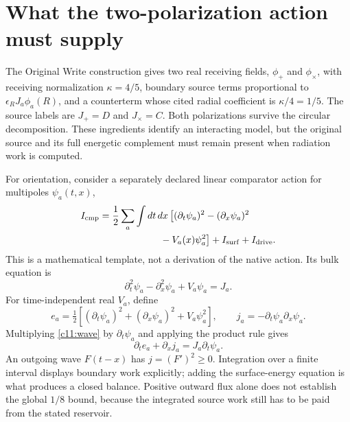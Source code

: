 \section{What the two-polarization action must supply}
The Original Write construction gives two real receiving fields, $\phi_+$ and $\phi_\times$, with receiving normalization $\kappa=4/5$, boundary source terms proportional to $\epsilon_R J_a\phi_a(R)$, and a counterterm whose cited radial coefficient is $\kappa/4=1/5$. The source labels are $J_+=D$ and $J_\times=C$. Both polarizations survive the circular decomposition. These ingredients identify an interacting model, but the original source and its full energetic complement must remain present when radiation work is computed.

For orientation, consider a separately declared linear comparator action for multipoles $\psi_a(t,x)$,
\begin{equation}
 \begin{aligned}
 I_{\rm cmp}={}&\frac12\sum_a\int dt\,dx\,
 \bigl[(\partial_t\psi_a)^2-(\partial_x\psi_a)^2\\
 &\hspace{5em}-V_a(x)\psi_a^2\bigr]
 +I_{\rm surf}+I_{\rm drive}.
 \end{aligned}
 \label{c11:comparatoraction}
\end{equation}
This is a mathematical template, not a derivation of the native action. Its bulk equation is
\begin{equation}
 \partial_t^2\psi_a-\partial_x^2\psi_a+V_a\psi_a=J_a.
 \label{c11:wave}
\end{equation}
For time-independent real $V_a$, define
\begin{equation}
 e_a=\tfrac12\left[(\partial_t\psi_a)^2+(\partial_x\psi_a)^2
                    +V_a\psi_a^2\right],\qquad
 j_a=-\partial_t\psi_a\partial_x\psi_a.
 \label{c11:energycurrent}
\end{equation}
Multiplying \eqref{c11:wave} by $\partial_t\psi_a$ and applying the product rule gives
\begin{equation}
 \partial_t e_a+\partial_x j_a=J_a\partial_t\psi_a.
 \label{c11:energyidentity}
\end{equation}
An outgoing wave $F(t-x)$ has $j=(F')^2\geq0$. Integration over a finite interval displays boundary work explicitly; adding the surface-energy equation is what produces a closed balance. Positive outward flux alone does not establish the global $1/8$ bound, because the integrated source work still has to be paid from the stated reservoir.

